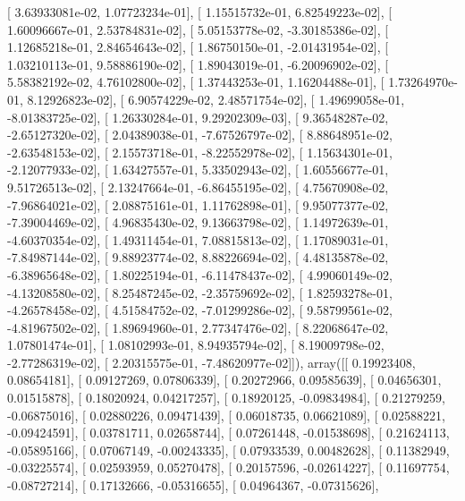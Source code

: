 \documentclass{article}
\begin{document}
       [  3.63933081e-02,   1.07723234e-01],
       [  1.15515732e-01,   6.82549223e-02],
       [  1.60096667e-01,   2.53784831e-02],
       [  5.05153778e-02,  -3.30185386e-02],
       [  1.12685218e-01,   2.84654643e-02],
       [  1.86750150e-01,  -2.01431954e-02],
       [  1.03210113e-01,   9.58886190e-02],
       [  1.89043019e-01,  -6.20096902e-02],
       [  5.58382192e-02,   4.76102800e-02],
       [  1.37443253e-01,   1.16204488e-01],
       [  1.73264970e-01,   8.12926823e-02],
       [  6.90574229e-02,   2.48571754e-02],
       [  1.49699058e-01,  -8.01383725e-02],
       [  1.26330284e-01,   9.29202309e-03],
       [  9.36548287e-02,  -2.65127320e-02],
       [  2.04389038e-01,  -7.67526797e-02],
       [  8.88648951e-02,  -2.63548153e-02],
       [  2.15573718e-01,  -8.22552978e-02],
       [  1.15634301e-01,  -2.12077933e-02],
       [  1.63427557e-01,   5.33502943e-02],
       [  1.60556677e-01,   9.51726513e-02],
       [  2.13247664e-01,  -6.86455195e-02],
       [  4.75670908e-02,  -7.96864021e-02],
       [  2.08875161e-01,   1.11762898e-01],
       [  9.95077377e-02,  -7.39004469e-02],
       [  4.96835430e-02,   9.13663798e-02],
       [  1.14972639e-01,  -4.60370354e-02],
       [  1.49311454e-01,   7.08815813e-02],
       [  1.17089031e-01,  -7.84987144e-02],
       [  9.88923774e-02,   8.88226694e-02],
       [  4.48135878e-02,  -6.38965648e-02],
       [  1.80225194e-01,  -6.11478437e-02],
       [  4.99060149e-02,  -4.13208580e-02],
       [  8.25487245e-02,  -2.35759692e-02],
       [  1.82593278e-01,  -4.26578458e-02],
       [  4.51584752e-02,  -7.01299286e-02],
       [  9.58799561e-02,  -4.81967502e-02],
       [  1.89694960e-01,   2.77347476e-02],
       [  8.22068647e-02,   1.07801474e-01],
       [  1.08102993e-01,   8.94935794e-02],
       [  8.19009798e-02,  -2.77286319e-02],
       [  2.20315575e-01,  -7.48620977e-02]]), array([[ 0.19923408,  0.08654181],
       [ 0.09127269,  0.07806339],
       [ 0.20272966,  0.09585639],
       [ 0.04656301,  0.01515878],
       [ 0.18020924,  0.04217257],
       [ 0.18920125, -0.09834984],
       [ 0.21279259, -0.06875016],
       [ 0.02880226,  0.09471439],
       [ 0.06018735,  0.06621089],
       [ 0.02588221, -0.09424591],
       [ 0.03781711,  0.02658744],
       [ 0.07261448, -0.01538698],
       [ 0.21624113, -0.05895166],
       [ 0.07067149, -0.00243335],
       [ 0.07933539,  0.00482628],
       [ 0.11382949, -0.03225574],
       [ 0.02593959,  0.05270478],
       [ 0.20157596, -0.02614227],
       [ 0.11697754, -0.08727214],
       [ 0.17132666, -0.05316655],
       [ 0.04964367, -0.07315626],
\end{document}
